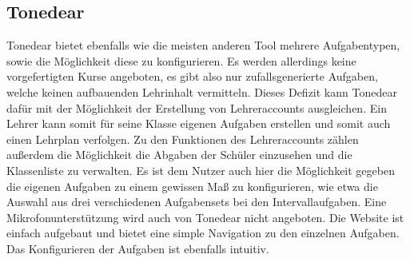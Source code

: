 \subsection*{Tonedear}
\label{sec:Tonedear}
Tonedear bietet ebenfalls wie die meisten anderen Tool mehrere Aufgabentypen, sowie die Möglichkeit diese zu konfigurieren. Es werden allerdings keine vorgefertigten Kurse angeboten, es gibt also nur zufallsgenerierte Aufgaben, welche keinen aufbauenden 
Lehrinhalt vermitteln. Dieses Defizit kann Tonedear dafür mit der Möglichkeit der Erstellung von Lehreraccounts ausgleichen. Ein Lehrer kann somit für seine Klasse eigenen Aufgaben erstellen und somit auch einen Lehrplan verfolgen.
Zu den Funktionen des Lehreraccounts zählen außerdem die Möglichkeit die Abgaben der Schüler einzusehen und die Klassenliste zu verwalten. Es ist dem Nutzer auch hier die Möglichkeit gegeben die eigenen Aufgaben
zu einem gewissen Maß zu konfigurieren, wie etwa die Auswahl aus drei verschiedenen Aufgabensets bei den Intervallaufgaben. Eine Mikrofonunterstützung wird auch von Tonedear nicht angeboten. Die Website ist einfach aufgebaut und bietet eine simple Navigation zu den einzelnen Aufgaben. 
Das Konfigurieren der Aufgaben ist ebenfalls intuitiv. \cite{tonedear}


